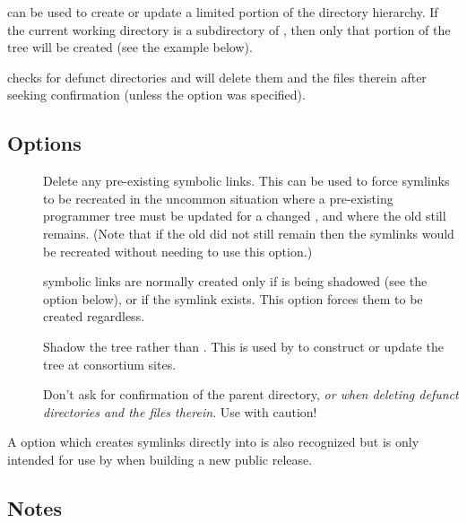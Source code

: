  can be used to create or update a limited portion of the
directory hierarchy.  If the current working directory is a subdirectory of
, then only that portion of the tree will be created (see the
example below).

 checks for defunct directories and will delete them and the files
therein after seeking confirmation (unless the  option was specified).

\subsection*{Options}

\begin{description}
\item[]
   Delete any pre-existing symbolic links.  This can be used to force symlinks
   to be recreated in the uncommon situation where a pre-existing programmer
   tree must be updated for a changed , and where the old
    still remains.  (Note that if the old  did
   not still remain then the symlinks would be recreated without needing to
   use this option.)

\item[]
    symbolic links are normally created only if  is
   being shadowed (see the  option below), or if the
    symlink exists.  This option forces them to be
   created regardless.

\item[]
   Shadow the  tree rather than .  This is
   used by  to construct or update the  tree
   at consortium sites.

\item[]
   Don't ask for confirmation of the parent directory, {\em or when deleting
   defunct directories and the files therein}.  Use with caution!
\end{description}

A  option which creates  symlinks directly into
 is also recognized but is only intended for use by
 when building a new public release.

\subsection*{Notes}
 
